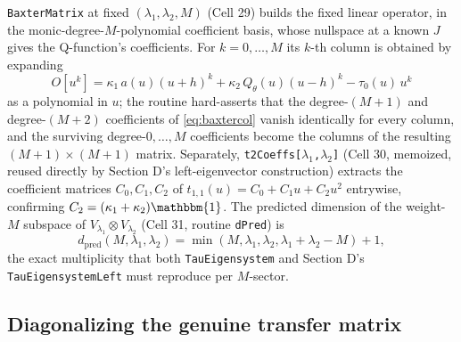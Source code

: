 \documentclass[11pt]{article}
\newcommand{\qth}{Q_\theta}
\begin{document}
\texttt{BaxterMatrix} at fixed $(\lambda_1,\lambda_2,M)$ (Cell 29) builds the fixed linear operator,
in the monic-degree-$M$-polynomial coefficient basis, whose nullspace at a known $J$ gives the
Q-function's coefficients. For $k=0,\dots,M$ its $k$-th column is obtained by expanding
\begin{equation}
  O[u^k] = \kappa_1\,a(u)(u+h)^k + \kappa_2\,\qth(u)(u-h)^k - \tau_0(u)\,u^k
  \label{eq:baxtercol}
\end{equation}
as a polynomial in $u$; the routine hard-asserts that the degree-$(M{+}1)$ and degree-$(M{+}2)$
coefficients of \eqref{eq:baxtercol} vanish identically for every column, and the surviving
degree-$0,\dots,M$ coefficients become the columns of the resulting $(M{+}1)\times(M{+}1)$ matrix.
Separately, \texttt{t2Coeffs[$\lambda_1$,$\lambda_2$]} (Cell 30, memoized, reused directly by
Section D's left-eigenvector construction) extracts the coefficient matrices $C_0,C_1,C_2$ of
$t_{1,1}(u) = C_0 + C_1 u + C_2 u^2$ entrywise, confirming $C_2=(\kappa_1+\kappa_2)\mathbbm{1}$. The
predicted dimension of the weight-$M$ subspace of $V_{\lambda_1}\otimes V_{\lambda_2}$ (Cell 31,
routine \texttt{dPred}) is
\[
  d_{\mathrm{pred}}(M,\lambda_1,\lambda_2) = \min(M,\lambda_1,\lambda_2,\lambda_1+\lambda_2-M) + 1,
\]
the exact multiplicity that both \texttt{TauEigensystem} and Section D's \texttt{TauEigensystemLeft}
must reproduce per $M$-sector.

\subsection*{Diagonalizing the genuine transfer matrix}
\end{document}
